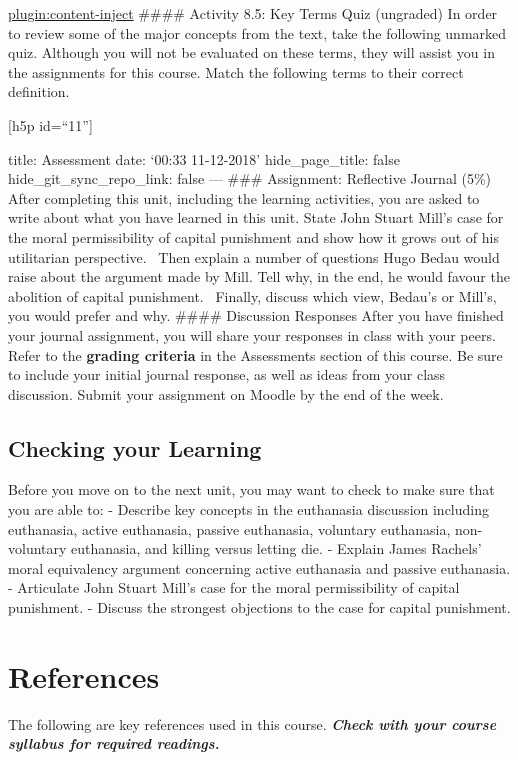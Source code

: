 \documentclass[
]{book}
\begin{document}
\href{../_8-5}{plugin:content-inject}
\#\#\#\# Activity 8.5: Key Terms Quiz (ungraded)
In order to review some of the major concepts from the text, take the following unmarked quiz. Although you will not be evaluated on these terms, they will assist you in the assignments for this course.
Match the following terms to their correct definition.

{[}h5p id=``11''{]}

title: Assessment
date: `00:33 11-12-2018'
hide\_page\_title: false
hide\_git\_sync\_repo\_link: false
---
\#\#\# Assignment: Reflective Journal (5\%)
After completing this unit, including the learning activities, you are asked to write about what you have learned in this unit.
State John Stuart Mill's case for the moral permissibility of capital punishment and show how it grows out of his utilitarian perspective. ~Then explain a number of questions Hugo Bedau would raise about the argument made by Mill. Tell why, in the end, he would favour the abolition of capital punishment. ~Finally, discuss which view, Bedau's or Mill's, you would prefer and why.
\#\#\#\# Discussion Responses
After you have finished your journal assignment, you will share your responses in class with your peers. Refer to the \textbf{grading criteria} in the Assessments section of this course. Be sure to include your initial journal response, as well as ideas from your class discussion. Submit your assignment on Moodle by the end of the week.

\hypertarget{checking-your-learning-7}{%
\section{Checking your Learning}\label{checking-your-learning-7}}

Before you move on to the next unit, you may want to check to make sure that you
are able to:
- Describe key concepts in the euthanasia discussion including euthanasia, active euthanasia, passive euthanasia, voluntary euthanasia, non-voluntary euthanasia, and killing versus letting die.
- Explain James Rachels' moral equivalency argument concerning active euthanasia and passive euthanasia.
- Articulate John Stuart Mill's case for the moral permissibility of capital punishment.
- Discuss the strongest objections to the case for capital punishment.

\hypertarget{references}{%
\chapter*{References}\label{references}}

The following are key references used in this course. \textbf{\emph{Check with your course syllabus for required readings.}}

  
\end{document}
